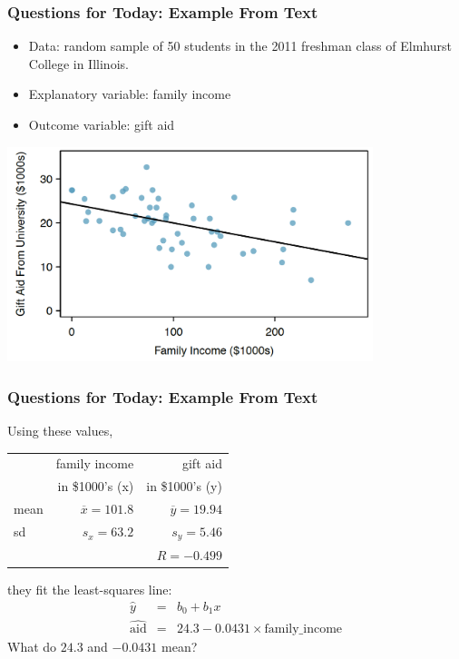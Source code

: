 \documentclass[slides]{beamer}
\newcommand{\blue}[1]{\textcolor{blue2}{#1}}
\begin{document}
\begin{frame}[fragile]
\frametitle{Questions for Today: Example From Text}
\begin{itemize}
\item Data: random sample of 50 students in the 2011 freshman class of Elmhurst College in Illinois.
\pause\item Explanatory variable: family income
\pause\item Outcome variable: gift aid
\end{itemize}

\begin{center}
\includegraphics[width=0.8\textwidth]{figure/regression.png}
\end{center}

\end{frame}


\begin{frame}[fragile]
\frametitle{Questions for Today: Example From Text}
Using these values,
\begin{center}
\begin{tabular}{l|rr}
& family income & gift aid \\
& in \$1000's (x) & in \$1000's (y) \\ 
\hline
mean & $\overline{x}=101.8$ & $\overline{y}=19.94$ \\ 
sd & $s_x=63.2$ & $s_y=5.46$ \\ 
\hline
 &  & $R=-0.499$ \\ 
\hline
\end{tabular}
\end{center}
they fit the \blue{least-squares line}:
\pause
\begin{eqnarray*}
\widehat{y} &=& b_0 + b_1 x\\
\widehat{\mbox{aid}} &=& 24.3 - 0.0431 \times \mbox{family\_income}
\end{eqnarray*}
What do $24.3$ and $-0.0431$ mean?

\end{frame}
\end{document}
